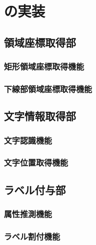 \chapter{\toolName の実装}\label{cha:Implementation}



\section{領域座標取得部}\label{sec:area_coords_obtainment_part}

\subsection{矩形領域座標取得機能}\label{subsec:rect_coords_obtainment}

\subsection{下線部領域座標取得機能}\label{subsec:underline_coords_obtainment}


\section{文字情報取得部}\label{sec:OCR_part}

\subsection{文字認識機能}\label{subsec:char_recognition}

\subsection{文字位置取得機能}\label{subsec:char_position_obtainment}


\section{ラベル付与部}\label{sec:label_link_part}

\subsection{属性推測機能}\label{subsec:att_prediction}

\subsection{ラベル割付機能}\label{subsec:label_link}